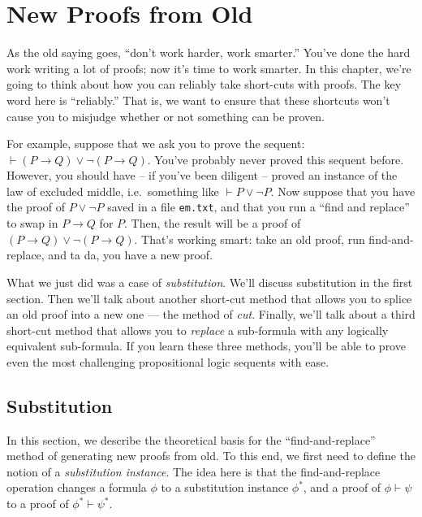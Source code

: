 \chapter{New Proofs from Old} \label{new}

As the old saying goes, ``don't work harder, work smarter.''  You've
done the hard work writing a lot of proofs; now it's time to work
smarter.  In this chapter, we're going to think about how you can
reliably take short-cuts with proofs.  The key word here is
``reliably.''  That is, we want to ensure that these shortcuts won't
cause you to misjudge whether or not something can be proven.

For example, suppose that we ask you to prove the sequent:
$\vdash (P\to Q)\vee \neg (P\to Q)$. You've probably never proved this
sequent before.  However, you should have -- if you've been diligent
-- proved an instance of the law of excluded middle, i.e.\ something
like $\vdash P\vee \neg P$.  Now suppose that you have the proof of
$P\vee\neg P$ saved in a file \texttt{em.txt}, and that you run a
``find and replace'' to swap in $P\to Q$ for $P$.  Then, the result
will be a proof of $(P\to Q)\vee \neg (P\to Q)$.  That's working
smart: take an old proof, run find-and-replace, and ta da, you have a
new proof.

What we just did was a case of {\it substitution}.  We'll discuss
substitution in the first section.  Then we'll talk about another
short-cut method that allows you to splice an old proof into a new one
--- the method of {\it cut}.  Finally, we'll talk about a third
short-cut method that allows you to {\it replace} a sub-formula with
any logically equivalent sub-formula.  If you learn these three
methods, you'll be able to prove even the most challenging
propositional logic sequents with ease.


\section{Substitution}

In this section, we describe the theoretical basis for the
``find-and-replace'' method of generating new proofs from old.  To
this end, we first need to define the notion of a
\emph{\gls{substitution instance}}.  The
idea here is that the find-and-replace operation changes a formula
$\phi$ to a substitution instance $\phi ^*$, and a proof of
$\phi\vdash\psi$ to a proof of $\phi ^*\vdash\psi ^*$.

